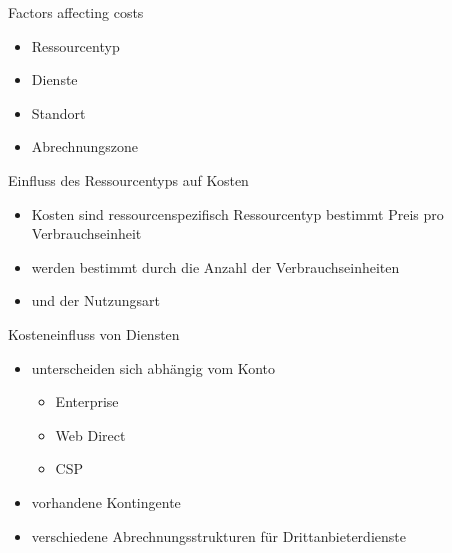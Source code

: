 \begin{flashcard}[Understand]{Factors affecting costs}
    \begin{itemize}
        \item Ressourcentyp
        \item Dienste
        \item Standort
        \item Abrechnungszone
    \end{itemize}

\end{flashcard}

\begin{flashcard}[\ ]{Einfluss des Ressourcentyps auf Kosten}
    \begin{itemize}
        \item Kosten sind ressourcenspezifisch\newline
            Ressourcentyp bestimmt Preis pro Verbrauchseinheit
        \item werden bestimmt durch die Anzahl der Verbrauchseinheiten
        \item und der Nutzungsart
    \end{itemize}

\end{flashcard}

\begin{flashcard}[\ ]{Kosteneinfluss von Diensten}
    \begin{itemize}
        \item unterscheiden sich abhängig vom Konto
        \begin{itemize}
            \item Enterprise
            \item Web Direct
            \item CSP
        \end{itemize}
        \item vorhandene Kontingente
        \item verschiedene Abrechnungsstrukturen für Drittanbieterdienste
    \end{itemize}
\end{flashcard}

